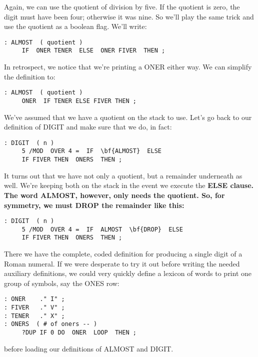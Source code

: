 Again, we can use the quotient of division by five. If the quotient is
zero, the digit must have been four; otherwise it was nine. So we'll play
the same trick and use the quotient as a boolean flag. We'll write:

\begin{verbatim}
: ALMOST  ( quotient )
     IF  ONER TENER  ELSE  ONER FIVER  THEN ;
\end{verbatim}

In retrospect, we notice that we're printing a ONER either way. We can
simplify the definition to:

\begin{verbatim}
: ALMOST  ( quotient )
     ONER  IF TENER ELSE FIVER THEN ;
\end{verbatim}

We've assumed that we have a quotient on the stack to use. Let's go back
to our definition of DIGIT and make sure that we do, in fact:

\begin{verbatim}
: DIGIT  ( n )
     5 /MOD  OVER 4 =  IF  \bf{ALMOST}  ELSE
     IF FIVER THEN  ONERS  THEN ;
\end{verbatim}

It turns out that we have not only a quotient, but a remainder
underneath as well. We're keeping both on the stack in the event we
execute the \bf{ELSE} clause. The word \bf{ALMOST}, however, only needs the
quotient. So, for symmetry, we must \bf{DROP} the remainder like this:

\begin{verbatim}
: DIGIT  ( n )
     5 /MOD  OVER 4 =  IF  ALMOST  \bf{DROP}  ELSE
     IF FIVER THEN  ONERS  THEN ;
\end{verbatim}

There we have the complete, coded definition for producing a single digit
of a Roman numeral. If we were desperate to try it out before writing the
needed auxiliary definitions, we could very quickly define a lexicon of
words to print one group of symbols, say the ONES row:

\begin{verbatim}
: ONER    ." I" ;
: FIVER   ." V" ;
: TENER   ." X" ;
: ONERS  ( # of oners -- )
     ?DUP IF 0 DO  ONER  LOOP  THEN ;
\end{verbatim}

before loading our definitions of ALMOST and DIGIT.

